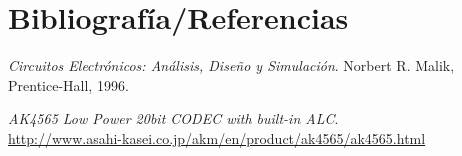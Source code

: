 \section{Bibliografía/Referencias}

\renewcommand*{\refname}{}


\begin{thebibliography}{9}


	\emph{Circuitos Electrónicos: Análisis, Diseño y Simulación}.
	Norbert R. Malik,
	Prentice-Hall,
	1996.
 

	\emph{AK4565 Low Power 20bit CODEC with built-in ALC}.\\
	\url{http://www.asahi-kasei.co.jp/akm/en/product/ak4565/ak4565.html}


\end{thebibliography}
